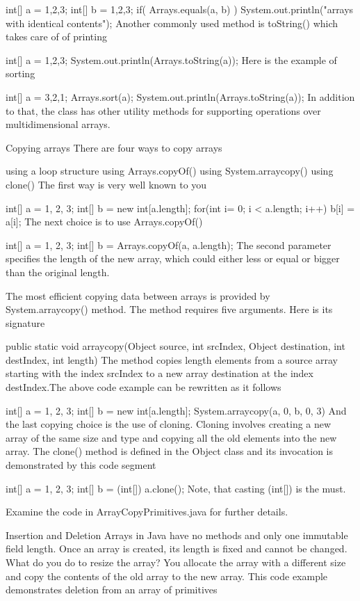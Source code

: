 int[] a = {1,2,3};
int[] b = {1,2,3};
if( Arrays.equals(a, b) )
   System.out.println("arrays with identical contents");
Another commonly used method is toString() which takes care of of printing

int[] a = {1,2,3};
System.out.println(Arrays.toString(a));
Here is the example of sorting

int[] a = {3,2,1};
Arrays.sort(a);
System.out.println(Arrays.toString(a));
In addition to that, the class has other utility methods for supporting operations over multidimensional arrays.

Copying arrays
There are four ways to copy arrays

using a loop structure using Arrays.copyOf() using System.arraycopy() using clone() The first way is very well known to you

int[] a = {1, 2, 3};
int[] b = new int[a.length];
for(int i= 0; i < a.length; i++) b[i] = a[i];
The next choice is to use Arrays.copyOf()

int[] a = {1, 2, 3};
int[] b = Arrays.copyOf(a, a.length);
The second parameter specifies the length of the new array, which could either less or equal or bigger than the original length.

The most efficient copying data between arrays is provided by System.arraycopy() method. The method requires five arguments. Here is its signature

public static void arraycopy(Object source,
                             int srcIndex,
                             Object destination,
                             int destIndex,
                             int length)
The method copies length elements from a source array starting with the index srcIndex to a new array destination at the index destIndex.The above code example can be rewritten as it follows

int[] a = {1, 2, 3};
int[] b = new int[a.length];
System.arraycopy(a, 0, b, 0, 3)
And the last copying choice is the use of cloning. Cloning involves creating a new array of the same size and type and copying all the old elements into the new array. The clone() method is defined in the Object class and its invocation is demonstrated by this code segment

int[] a = {1, 2, 3};
int[] b = (int[]) a.clone();
Note, that casting (int[]) is the must.

Examine the code in ArrayCopyPrimitives.java for further details.

Insertion and Deletion
Arrays in Java have no methods and only one immutable field length. Once an array is created, its length is fixed and cannot be changed. What do you do to resize the array? You allocate the array with a different size and copy the contents of the old array to the new array. This code example demonstrates deletion from an array of primitives

